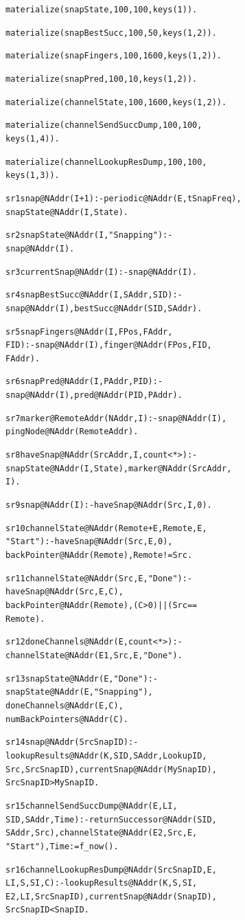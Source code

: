 \documentclass{sig-alt-full}
\newenvironment{overlog}{\begin{alltt}\footnotesize}{\end{alltt}}
\begin{document}
\begin{overlog}
materialize(snapState, 100, 100, keys(1)).

materialize(snapBestSucc, 100, 50, keys(1, 2)).

materialize(snapFingers, 100, 1600, keys(1, 2)).

materialize(snapPred, 100, 10, keys(1, 2)).

materialize(channelState, 100, 1600, keys(1, 2)).

materialize(channelSendSuccDump, 100, 100,
   keys(1, 4)).

materialize(channelLookupResDump, 100, 100,
   keys(1, 3)).

sr1 snap@NAddr(I + 1) :- periodic@NAddr(E, tSnapFreq),
   snapState@NAddr(I, State).

sr2 snapState@NAddr(I, "Snapping") :-
   snap@NAddr(I).

sr3 currentSnap@NAddr(I) :- snap@NAddr(I).

sr4 snapBestSucc@NAddr(I, SAddr, SID) :-
   snap@NAddr(I), bestSucc@NAddr(SID, SAddr).

sr5 snapFingers@NAddr(I, FPos, FAddr,
   FID) :- snap@NAddr(I), finger@NAddr(FPos, FID,
   FAddr).

sr6 snapPred@NAddr(I, PAddr, PID) :-
   snap@NAddr(I), pred@NAddr(PID, PAddr).

sr7 marker@RemoteAddr(NAddr, I) :- snap@NAddr(I),
   pingNode@NAddr(RemoteAddr).

sr8 haveSnap@NAddr(SrcAddr, I, count<*>) :-
   snapState@NAddr(I, State), marker@NAddr(SrcAddr,
   I).

sr9 snap@NAddr(I) :- haveSnap@NAddr(Src, I, 0).

sr10 channelState@NAddr(Remote + E, Remote, E,
   "Start") :- haveSnap@NAddr(Src, E, 0),
   backPointer@NAddr(Remote), Remote != Src.

sr11 channelState@NAddr(Src, E, "Done") :-
   haveSnap@NAddr(Src, E, C),
   backPointer@NAddr(Remote), (C > 0) || (Src ==
   Remote).

sr12 doneChannels@NAddr(E, count<*>) :-
   channelState@NAddr(E1, Src, E, "Done").

sr13 snapState@NAddr(E, "Done") :-
   snapState@NAddr(E, "Snapping"),
   doneChannels@NAddr(E, C),
   numBackPointers@NAddr(C).

sr14 snap@NAddr(SrcSnapID) :-
   lookupResults@NAddr(K, SID, SAddr, LookupID,
   Src, SrcSnapID), currentSnap@NAddr(MySnapID),
   SrcSnapID > MySnapID.

sr15 channelSendSuccDump@NAddr(E, LI,
   SID, SAddr, Time) :- returnSuccessor@NAddr(SID,
   SAddr, Src), channelState@NAddr(E2, Src, E,
   "Start"), Time := f_now().

sr16 channelLookupResDump@NAddr(SrcSnapID, E,
   LI, S, SI, C) :- lookupResults@NAddr(K, S, SI,
   E2, LI, SrcSnapID), currentSnap@NAddr(SnapID),
   SrcSnapID < SnapID.
\end{overlog}
\end{document}
